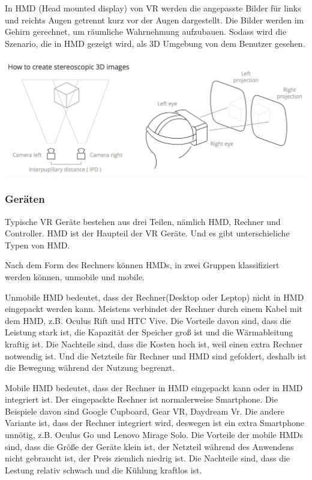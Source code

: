 In HMD (Head mounted display) von VR werden die angepasste Bilder für links und reichts Augen getrennt kurz vor der Augen dargestellt. Die Bilder werden im Gehirn gerechnet, um räumliche Wahrnehmung aufzubauen. Sodass wird die Szenario, die in HMD gezeigt wird, als 3D Umgebung von dem Benutzer gesehen.

\includegraphics[width=\textwidth]{images/howToCreate.png}

  \subsubsection{Geräten}
  Typische VR Geräte bestehen aus drei Teilen, nämlich HMD, Rechner und Controller. HMD ist der Haupteil der VR Geräte. Und es gibt unterschieliche Typen von HMD.
  
  Nach dem Form des Rechners können HMDs, in zwei Gruppen klassifiziert werden können, unmobile und mobile.
  
  Unmobile HMD bedeutet, dass der Rechner(Desktop oder Leptop) nicht in HMD eingepackt werden kann. Meistens verbindet der Rechner durch einem Kabel mit dem HMD, z.B. Oculus Rift und HTC Vive. Die Vorteile davon sind, dass die Leistung stark ist, die Kapazität der Speicher groß ist und die Wärmableitung kraftig ist. Die Nachteile sind, dass die Kosten hoch ist, weil einen extra Rechner notwendig ist. Und die Netzteile für Rechner und HMD sind gefoldert, deshalb ist die Bewegung während der Nutzung begrenzt.
  
  Mobile HMD bedeutet, dass der Rechner in HMD eingepackt kann oder in HMD integriert ist. Der eingepackte Rechner ist normalerweise Smartphone. Die Beispiele davon sind Google Cupboard, Gear VR, Daydream Vr. Die andere Variante ist, dass der Rechner integriert wird, deswegen ist ein extra Smartphone unnötig, z.B. Oculus Go und Lenovo Mirage Solo. Die Vorteile der mobile HMDs sind, dass die Größe der Geräte klein ist, der Netzteil während des Anwendens nicht gebraucht ist, der Preis ziemlich niedrig ist. Die Nachteile sind, dass die Lestung relativ schwach und die Kühlung kraftlos ist.
  
